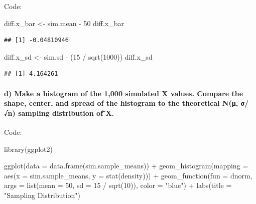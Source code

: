 \documentclass[
]{article}
\newenvironment{Shaded}{\begin{snugshade}}{\end{snugshade}}
\newcommand{\AttributeTok}[1]{\textcolor[rgb]{0.77,0.63,0.00}{#1}}
\newcommand{\DecValTok}[1]{\textcolor[rgb]{0.00,0.00,0.81}{#1}}
\newcommand{\FunctionTok}[1]{\textcolor[rgb]{0.00,0.00,0.00}{#1}}
\newcommand{\NormalTok}[1]{#1}
\newcommand{\OtherTok}[1]{\textcolor[rgb]{0.56,0.35,0.01}{#1}}
\newcommand{\SpecialCharTok}[1]{\textcolor[rgb]{0.00,0.00,0.00}{#1}}
\newcommand{\StringTok}[1]{\textcolor[rgb]{0.31,0.60,0.02}{#1}}
\begin{document}
Code:

\begin{Shaded}
\begin{Highlighting}[]
\NormalTok{diff.x\_bar }\OtherTok{\textless{}{-}}\NormalTok{ sim.mean }\SpecialCharTok{{-}} \DecValTok{50}
\NormalTok{diff.x\_bar}
\end{Highlighting}
\end{Shaded}

\begin{verbatim}
## [1] -0.04810946
\end{verbatim}

\begin{Shaded}
\begin{Highlighting}[]
\NormalTok{diff.x\_sd }\OtherTok{\textless{}{-}}\NormalTok{ sim.sd }\SpecialCharTok{{-}}\NormalTok{ (}\DecValTok{15} \SpecialCharTok{/} \FunctionTok{sqrt}\NormalTok{(}\DecValTok{1000}\NormalTok{))}
\NormalTok{diff.x\_sd}
\end{Highlighting}
\end{Shaded}

\begin{verbatim}
## [1] 4.164261
\end{verbatim}

\newpage

\hypertarget{d-make-a-histogram-of-the-1000-simulated-x-values.-compare-the-shape-center-and-spread-of-the-histogram-to-the-theoretical-nux3bc-ux3c3n-sampling-distribution-of-x.}{%
\paragraph{d) Make a histogram of the 1,000 simulated ̄X values. Compare
the shape, center, and spread of the histogram to the theoretical N(μ,
σ/√n) sampling distribution of
̄X.}\label{d-make-a-histogram-of-the-1000-simulated-x-values.-compare-the-shape-center-and-spread-of-the-histogram-to-the-theoretical-nux3bc-ux3c3n-sampling-distribution-of-x.}}

Code:

\begin{Shaded}
\begin{Highlighting}[]
\FunctionTok{library}\NormalTok{(ggplot2)}

\FunctionTok{ggplot}\NormalTok{(}\AttributeTok{data =} \FunctionTok{data.frame}\NormalTok{(sim.sample\_means)) }\SpecialCharTok{+}
  \FunctionTok{geom\_histogram}\NormalTok{(}\AttributeTok{mapping =} \FunctionTok{aes}\NormalTok{(}\AttributeTok{x =}\NormalTok{ sim.sample\_means, }\AttributeTok{y =} \FunctionTok{stat}\NormalTok{(density))) }\SpecialCharTok{+}
  \FunctionTok{geom\_function}\NormalTok{(}\AttributeTok{fun =}\NormalTok{ dnorm,}
                \AttributeTok{args =} \FunctionTok{list}\NormalTok{(}\AttributeTok{mean =} \DecValTok{50}\NormalTok{, }\AttributeTok{sd =} \DecValTok{15} \SpecialCharTok{/} \FunctionTok{sqrt}\NormalTok{(}\DecValTok{10}\NormalTok{)),}
                \AttributeTok{color =} \StringTok{"blue"}\NormalTok{) }\SpecialCharTok{+}
  \FunctionTok{labs}\NormalTok{(}\AttributeTok{title =} \StringTok{"Sampling Distribution"}\NormalTok{)}
\end{Highlighting}
\end{Shaded}
\end{document}
